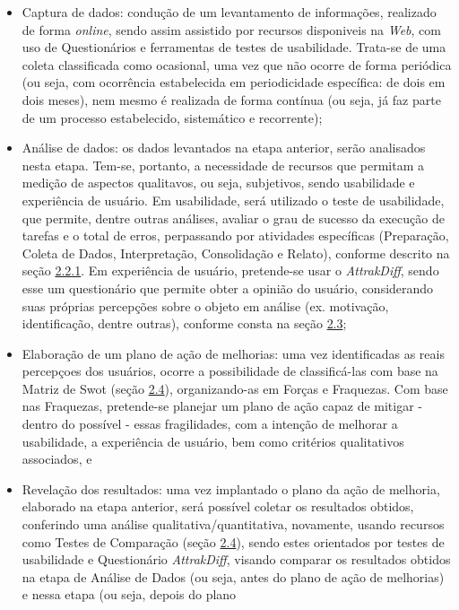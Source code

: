 \begin{itemize}
	\item Captura de dados: condução de um levantamento de informações, realizado de forma \textit{online}, sendo assim assistido por recursos disponiveis na \textit{Web}, com uso de Questionários e ferramentas de testes de usabilidade. Trata-se de uma coleta classificada como ocasional, uma vez que não ocorre de forma periódica (ou seja, com ocorrência estabelecida em periodicidade específica: de dois em dois meses), nem mesmo é realizada de forma contínua (ou seja, já faz parte de um processo estabelecido, sistemático e recorrente);
	\item Análise de dados: os dados levantados na etapa anterior, serão analisados nesta etapa. Tem-se, portanto, a necessidade de recursos que permitam a medição de aspectos qualitavos, ou seja, subjetivos, sendo usabilidade e experiência de usuário. Em usabilidade, será utilizado o teste de usabilidade, que permite, dentre outras análises, avaliar o grau de sucesso da execução de tarefas e o total de erros, perpassando por atividades específicas (Preparação, Coleta de Dados, Interpretação, Consolidação e Relato), conforme 
	descrito na seção \hyperref[sec:Medição1]{2.2.1}. Em experiência de usuário, pretende-se usar o \textit{AttrakDiff}, sendo esse um questionário que permite obter a opinião do usuário, considerando suas próprias percepções sobre o objeto em análise (ex. motivação, identificação, dentre outras), conforme consta na seção \hyperref[sec:Experiencia de Usuario]{2.3};
	\item Elaboração de um plano de ação de melhorias: uma vez identificadas as reais percepçoes dos usuários, ocorre a possibilidade de classificá-las com base na Matriz de Swot (seção \hyperref[sec:Teste de Comparação]{2.4}), organizando-as em Forças e Fraquezas. Com base nas Fraquezas, pretende-se planejar um plano de ação capaz de mitigar - dentro do possível - essas fragilidades, com a intenção de melhorar a usabilidade, a experiência de usuário, bem como critérios qualitativos associados, e
	\item Revelação dos resultados: uma vez implantado o plano da ação de melhoria, elaborado na etapa anterior, será possível coletar os resultados obtidos, conferindo uma análise qualitativa/quantitativa, novamente, usando recursos como Testes de Comparação (seção \hyperref[sec:Teste de Comparação]{2.4}), sendo estes orientados por testes de usabilidade e Questionário \textit{AttrakDiff}, visando comparar os resultados obtidos na etapa de Análise de Dados (ou seja, antes do plano de ação de melhorias) e nessa etapa (ou seja, depois do plano 

\end{itemize}
